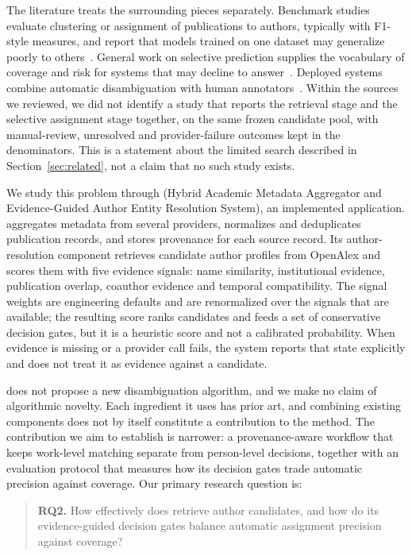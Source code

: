 The literature treats the surrounding pieces separately. Benchmark studies evaluate clustering or assignment of publications to authors, typically with F1-style measures, and report that models trained on one dataset may generalize poorly to others~\cite{subramanian2021s2and,chen2023whoiswho}. General work on selective prediction supplies the vocabulary of coverage and risk for systems that may decline to answer~\cite{chow1970reject,elyaniv2010foundations,geifman2019selectivenet}. Deployed systems combine automatic disambiguation with human annotators~\cite{zhang2018aminerhitl}. Within the sources we reviewed, we did not identify a study that reports the retrieval stage and the selective assignment stage together, on the same frozen candidate pool, with manual-review, unresolved and provider-failure outcomes kept in the denominators. This is a statement about the limited search described in Section~\ref{sec:related}, not a claim that no such study exists.

We study this problem through \hammer{} (Hybrid Academic Metadata Aggregator and Evidence-Guided Author Entity Resolution System), an implemented application. \hammer{} aggregates metadata from several providers, normalizes and deduplicates publication records, and stores provenance for each source record. Its author-resolution component retrieves candidate author profiles from OpenAlex and scores them with five evidence signals: name similarity, institutional evidence, publication overlap, coauthor evidence and temporal compatibility. The signal weights are engineering defaults and are renormalized over the signals that are available; the resulting score ranks candidates and feeds a set of conservative decision gates, but it is a heuristic score and not a calibrated probability. When evidence is missing or a provider call fails, the system reports that state explicitly and does not treat it as evidence against a candidate.

\hammer{} does not propose a new disambiguation algorithm, and we make no claim of algorithmic novelty. Each ingredient it uses has prior art, and combining existing components does not by itself constitute a contribution to the method. The contribution we aim to establish is narrower: a provenance-aware workflow that keeps work-level matching separate from person-level decisions, together with an evaluation protocol that measures how its decision gates trade automatic precision against coverage. Our primary research question is:

\begin{quote}
\textbf{RQ2.} How effectively does \hammer{} retrieve author candidates, and how do its evidence-guided decision gates balance automatic assignment precision against coverage?
\end{quote}

